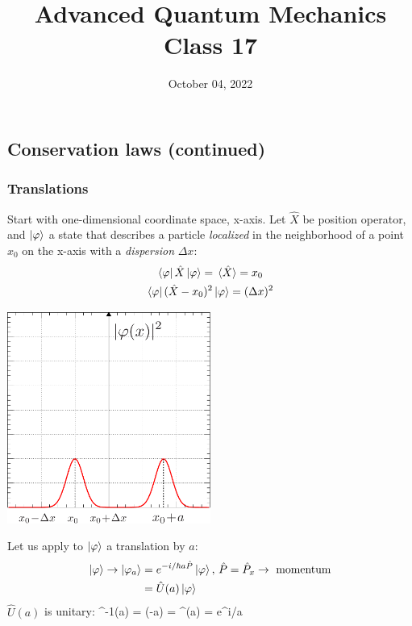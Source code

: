 \documentclass[12pt]{article}
\title{Advanced Quantum Mechanics\\Class 17}
\date{October 04, 2022}                                           %
\begin{document}
\maketitle

\subsection{Conservation laws (continued)}

\subsubsection{Translations}
 
Start with one-dimensional coordinate space, x-axis.
Let $\hat{X}$ be position operator, and $\ket{\varphi}$ a state
that describes a particle \emph{localized} in the neighborhood
of a point $x_0$ on the x-axis with a \emph{dispersion} $\Delta x$:
\begin{gather}
\bra{\varphi}\hat{X}\ket{\varphi} = \ev*{\hat{X}} = x_0\\
\bra{\varphi}(\hat{X}-x_0)^2\ket{\varphi} = (\Delta x)^2
\end{gather}

\begin{center}
\includegraphics[width=0.5\textwidth]{Figures/translation.pdf}
\end{center}
Let us apply to $\ket{\varphi}$ a translation by $a$:
\begin{align}
\ket{\varphi} \rightarrow \ket{\varphi_a} 
&= e^{-i/\hbar a \hat{P}} \ket{\varphi},\, \hat{P} = \hat{P}_x \rightarrow \text{ momentum}\\
&= \hat{U}(a) \ket{\varphi}
\end{align}
%
$\hat{U}(a)$ is unitary:
\be
{}^{-1}(a) = (-a) 
= ^{\dagger}(a) = e^{i/\hbar a }
\ee
\end{document}
